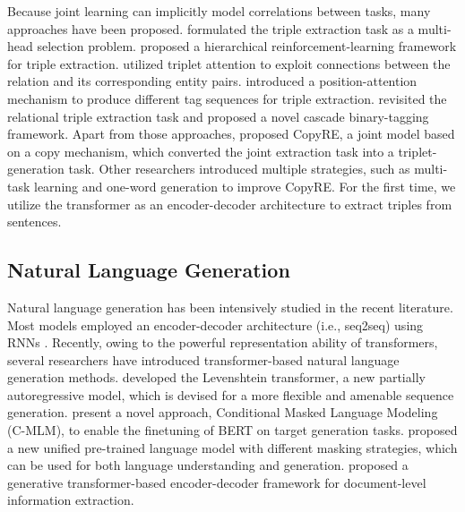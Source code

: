 \documentclass[letterpaper]{article} \usepackage{aaai21}  \usepackage{times}  \usepackage{helvet} \usepackage{courier}  \usepackage[hyphens]{url}  \usepackage{graphicx} \urlstyle{rm} \def\UrlFont{\rm}  \usepackage{natbib}  \usepackage[noend]{algpseudocode}
\begin{document}
Because joint learning can implicitly model correlations between tasks, many approaches have been proposed. \citet{bekoulis2018joint} formulated the triple extraction task as a multi-head selection problem. \citet{takanobu2019hierarchical} proposed a hierarchical reinforcement-learning framework for triple extraction. \citet{chen2019mrmep} utilized triplet attention to exploit connections between the relation and its corresponding entity pairs. \citet{2019Joint} introduced a position-attention mechanism to produce different tag sequences for triple extraction.\citet{wei2019joint} revisited the relational triple extraction task and proposed a novel cascade binary-tagging framework. Apart from those approaches, \citet{zeng2018extracting} proposed CopyRE, a joint model based on a copy mechanism, which converted the joint extraction task into a triplet-generation task. Other researchers  introduced multiple strategies, such as multi-task learning \cite{zeng2020copymtl} and one-word generation \cite{nayak2019effective} to improve CopyRE. For the first time, we utilize the transformer as an encoder-decoder architecture to extract triples from sentences.

\subsection{Natural Language Generation} 
Natural language generation has been intensively studied in the recent literature. Most models employed an encoder-decoder architecture (i.e., seq2seq) using RNNs \cite{schuster1997bidirectional,zhang-etal-2020-summarizing,krause2020gedi}. Recently, owing to the powerful representation ability of transformers, several researchers have introduced transformer-based natural language generation methods. \citet{gu2019levenshtein} developed the Levenshtein transformer, a new partially autoregressive model, which is devised for a more flexible and amenable sequence generation. \citet{chen2020distilling} present a novel approach, Conditional Masked Language Modeling (C-MLM), to enable the finetuning of BERT \cite{devlin2018bert} on target generation tasks. \citet{dong2019unified} proposed a new unified pre-trained language model with different masking strategies, which can be used for both language understanding and generation. \citet{du2020document} proposed a generative transformer-based encoder-decoder framework for document-level information extraction.
\end{document}
